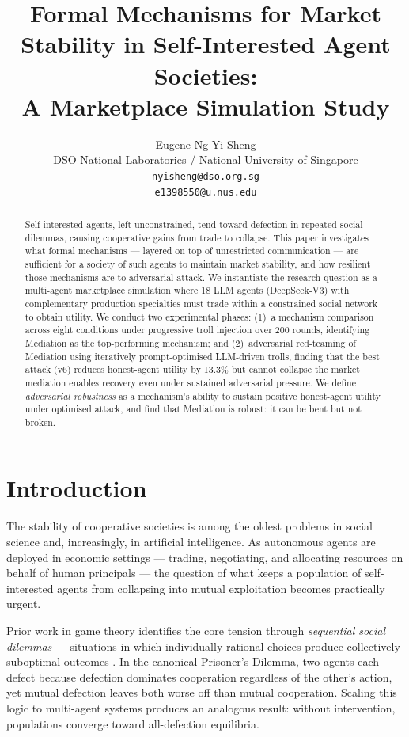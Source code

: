\documentclass{article}
\title{Formal Mechanisms for Market Stability in Self-Interested Agent Societies:\\
A Marketplace Simulation Study}
\author{
  Eugene Ng Yi Sheng \\
  DSO National Laboratories / National University of Singapore \\
  \texttt{nyisheng@dso.org.sg} \\
  \texttt{e1398550@u.nus.edu}
}
\date{}
\begin{document}

\maketitle

\begin{abstract}
Self-interested agents, left unconstrained, tend toward defection in repeated social dilemmas, causing cooperative gains from trade to collapse. This paper investigates what formal mechanisms --- layered on top of unrestricted communication --- are sufficient for a society of such agents to maintain market stability, and how resilient those mechanisms are to adversarial attack. We instantiate the research question as a multi-agent marketplace simulation where 18 LLM agents (DeepSeek-V3) with complementary production specialties must trade within a constrained social network to obtain utility. We conduct two experimental phases: (1)~a mechanism comparison across eight conditions under progressive troll injection over 200 rounds, identifying Mediation as the top-performing mechanism; and (2)~adversarial red-teaming of Mediation using iteratively prompt-optimised LLM-driven trolls, finding that the best attack (v6) reduces honest-agent utility by 13.3\% but cannot collapse the market --- mediation enables recovery even under sustained adversarial pressure. We define \textit{adversarial robustness} as a mechanism's ability to sustain positive honest-agent utility under optimised attack, and find that Mediation is robust: it can be bent but not broken.
\end{abstract}

\section{Introduction}
\label{sec:introduction}

The stability of cooperative societies is among the oldest problems in social science and, increasingly, in artificial intelligence. As autonomous agents are deployed in economic settings --- trading, negotiating, and allocating resources on behalf of human principals --- the question of what keeps a population of self-interested agents from collapsing into mutual exploitation becomes practically urgent.

Prior work in game theory identifies the core tension through \textit{sequential social dilemmas} --- situations in which individually rational choices produce collectively suboptimal outcomes \citep{coopeval}. In the canonical Prisoner's Dilemma, two agents each defect because defection dominates cooperation regardless of the other's action, yet mutual defection leaves both worse off than mutual cooperation. Scaling this logic to multi-agent systems produces an analogous result: without intervention, populations converge toward all-defection equilibria.
\end{document}
